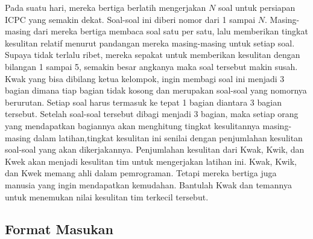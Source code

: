 \documentclass{article}
\begin{document}
Pada suatu hari, mereka bertiga berlatih mengerjakan $N$ soal untuk persiapan ICPC yang semakin dekat. Soal-soal ini diberi nomor dari 1 sampai $N$. Masing-masing dari mereka bertiga membaca soal satu per satu, lalu memberikan tingkat kesulitan relatif menurut pandangan mereka masing-masing untuk setiap soal. Supaya tidak terlalu ribet, mereka sepakat untuk memberikan kesulitan dengan bilangan 1 sampai 5, semakin besar angkanya maka soal tersebut makin susah.
Kwak yang bisa dibilang ketua kelompok, ingin membagi  soal ini menjadi 3 bagian dimana tiap bagian tidak kosong dan merupakan soal-soal yang nomornya berurutan. Setiap soal harus termasuk ke tepat 1 bagian diantara 3 bagian tersebut. Setelah soal-soal tersebut dibagi menjadi 3 bagian, maka setiap orang yang mendapatkan bagiannya akan menghitung tingkat kesulitannya masing-masing dalam latihan,tingkat kesulitan ini senilai dengan penjumlahan kesulitan soal-soal yang akan dikerjakannya. Penjumlahan kesulitan dari Kwak, Kwik, dan Kwek akan menjadi kesulitan tim untuk mengerjakan latihan ini.
Kwak, Kwik, dan Kwek memang ahli dalam pemrograman. Tetapi mereka bertiga juga manusia yang ingin mendapatkan kemudahan. Bantulah Kwak dan temannya untuk menemukan nilai kesulitan tim terkecil tersebut.




\subsection*{Format Masukan}

\end{document}
